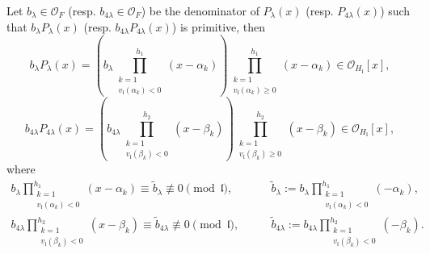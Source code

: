 \documentclass{amsart}
\numberwithin{equation}{subsection}
\numberwithin{theorem}{section}
\theoremstyle{definition}
\theoremstyle{remark}
\newcommand{\cO}{\mathcal{O}}
\begin{document}
Let $b_{\lambda} \in \cO_F$ (resp. $b_{4\lambda}\in \cO_F$) be the denominator of $P_{\lambda}(x)$ (resp. $P_{4\lambda}(x)$) such that $b_{\lambda}P_{\lambda}(x)$ (resp. $b_{4\lambda}P_{4\lambda}(x)$) is primitive, then \[b_{\lambda} P_{\lambda}(x) = \left(b_{\lambda}\prod_{\substack{k=1 \\ v_{\mathfrak{l}}(\alpha_k)<0}}^{h_1}(x-\alpha_k)\right) \prod_{\substack{k=1 \\ v_{\mathfrak{l}}(\alpha_k)\geq0}}^{h_1}(x-\alpha_k) \in \cO_{H_{\mathfrak{l}}}[x],\] 
\[b_{4\lambda} P_{4\lambda}(x) = \left(b_{4\lambda}\prod_{\substack{k=1 \\ v_{\mathfrak{l}}(\beta_k)<0}}^{h_2}(x-\beta_k)\right) \prod_{\substack{k=1 \\ v_{\mathfrak{l}}(\beta_k)\geq0}}^{h_2}(x-\beta_k) \in \cO_{H_{\mathfrak{l}}}[x],\]
where \begin{align*}
    b_{\lambda}\prod_{\substack{k=1 \\ v_{\mathfrak{l}}(\alpha_k)<0}}^{h_1}(x-\alpha_k) \equiv \tilde{b}_{\lambda}\not\equiv 0 \pmod{\mathfrak{l}}, \qquad &\tilde{b}_{\lambda} := b_{\lambda} \prod_{\substack{k=1 \\ v_{\mathfrak{l}}(\alpha_k)<0}}^{h_1}(-\alpha_k), \\
    b_{4\lambda}\prod_{\substack{k=1 \\ v_{\mathfrak{l}}(\beta_k)<0}}^{h_2}(x-\beta_k) \equiv \tilde{b}_{4\lambda}\not\equiv 0 \pmod{\mathfrak{l}}, \qquad &\tilde{b}_{4\lambda} := b_{4\lambda} \prod_{\substack{k=1 \\ v_{\mathfrak{l}}(\beta_k)<0}}^{h_2}(-\beta_k).
\end{align*}
\end{document}
